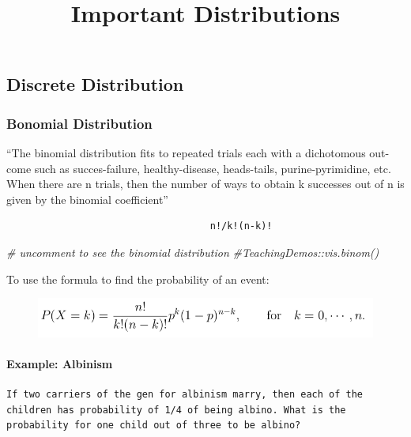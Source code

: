 \documentclass[]{article}
\title{Important Distributions}
\author{}
\date{}
\newenvironment{Shaded}{\begin{snugshade}}{\end{snugshade}}
\newcommand{\CommentTok}[1]{\textcolor[rgb]{0.56,0.35,0.01}{\textit{#1}}}
\let\oldparagraph\paragraph
\renewcommand{\paragraph}[1]{\oldparagraph{#1}\mbox{}}
\begin{document}
\maketitle

\subsection{Discrete Distribution}\label{discrete-distribution}

\subsubsection{Bonomial Distribution}\label{bonomial-distribution}

``The binomial distribution fits to repeated trials each with a
dichotomous out-come such as succes-failure, healthy-disease,
heads-tails, purine-pyrimidine, etc. When there are n trials, then the
number of ways to obtain k successes out of n is given by the binomial
coefficient''

\begin{verbatim}
                                    n!/k!(n-k)!
\end{verbatim}

\begin{Shaded}
\begin{Highlighting}[]
\CommentTok{# uncomment to see the binomial distribution}
\CommentTok{#TeachingDemos::vis.binom()}
\end{Highlighting}
\end{Shaded}

To use the formula to find the probability of an event:

\begin{figure}
\centering
\includegraphics{binomial.png}
\caption{}
\end{figure}

\paragraph{Example: Albinism}\label{example-albinism}

\begin{verbatim}
If two carriers of the gen for albinism marry, then each of the children has probability of 1/4 of being albino. What is the probability for one child out of three to be albino?
\end{verbatim}
\end{document}
